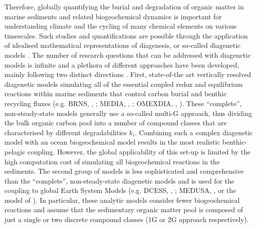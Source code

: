 \documentclass[gmd, manuscript]{copernicus}
\begin{document}
Therefore, globally quantifying the burial and degradation of organic matter in marine sediments and related biogeochemical dynamics is important for understanding climate and the cycling of many chemical elements on various timescales.
Such studies and quantifications are possible through the application of idealised mathematical representations of diagenesis, or so-called diagenetic models \citep[e.g.][]{berner_early_1980, boudreau1997diagenetic}.
The number of research questions that can be addressed with diagenetic models is infinite and a plethora of different approaches have been developed, mainly following two distinct directions \citep{arndt_quantifying_2013}. 
First, state-of-the art vertically resolved diagenetic models simulating all of the essential coupled redox and equilibrium reactions within marine sediments that control carbon burial and benthic recycling fluxes 
(e.g. BRNS, \citeauthor{aguilera_knowledge-based_2005}, \citeyear{aguilera_knowledge-based_2005}; 
MEDIA, \citeauthor{meysman_reactive_2003}, \citeyear{meysman_reactive_2003}; OMEXDIA, \citeauthor{soetaert_model_1996}, \citeyear{soetaert_model_1996}). These ``complete'', non-steady-state models generally use a so-called multi-G approach, 
thus dividing the bulk organic carbon pool into a number of compound classes that are characterised by different degradabilities $k_i$. Combining such a complex diagenetic model with an ocean biogeochemical model results in 
the most realistic benthic-pelagic coupling. However, the global applicability of this set-up is limited by the high computation cost of simulating all biogeochemical reactions in the sediments. 
The second group of models is less sophisticated and comprehensive than the ``complete'', non-steady-state diagenetic models and is used for the coupling to global Earth System Models 
(e.g. DCESS, \citeauthor{shaffer_presentation_2008}, \citeyear{shaffer_presentation_2008}; MEDUSA, \citeauthor{munhoven_glacialinterglacial_2007}, \citeyear{munhoven_glacialinterglacial_2007} or the model of \citet{heinze_global_1999}). 
In particular, these analytic models consider fewer biogeochemical reactions and assume that the sedimentary organic matter pool is composed 
of just a single or two discrete compound classes (1G or 2G approach respectively). %

\end{document}

